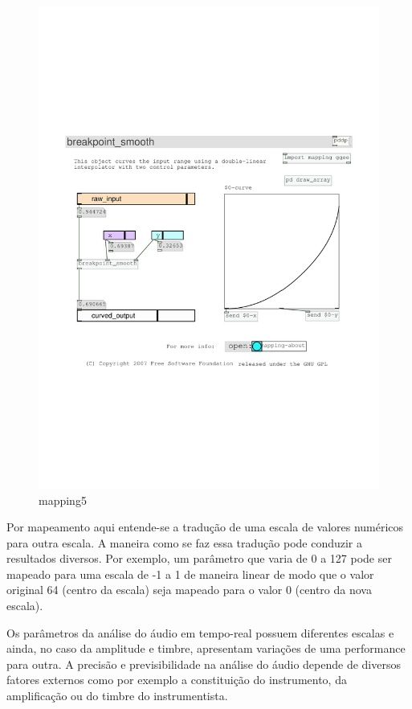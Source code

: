 \documentclass{ppgmus}
\begin{document}
\begin{figure}
\includegraphics[scale=.4]{mapping5}
\caption{mapping5}
\label{mapping5}
\end{figure}

Por mapeamento aqui entende-se a tradução de uma escala
de valores numéricos para outra escala. A maneira como
se faz essa tradução pode conduzir a resultados diversos.
Por exemplo, um parâmetro que varia de 0 a 127 pode ser 
mapeado para uma escala de -1 a 1 de maneira linear de modo
que o valor original 64 (centro da escala) seja mapeado para o valor 0 (centro
da nova escala).

Os parâmetros da análise do áudio em tempo-real possuem diferentes
escalas e ainda, no caso da amplitude e timbre, apresentam variações de uma
performance para outra. A precisão e previsibilidade na análise do áudio 
depende de diversos fatores externos como por exemplo a constituição do instrumento, da
amplificação ou do timbre do instrumentista.
\end{document}
